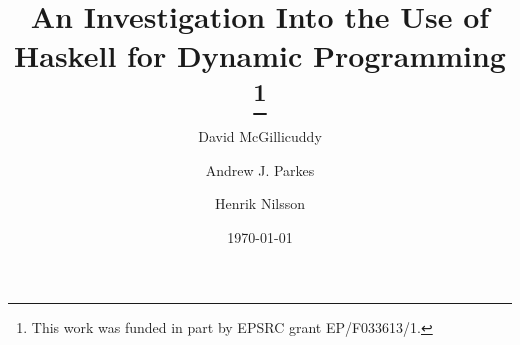 \documentclass[smallextended]{svjour3}       %
\begin{document}
\title{An Investigation Into the Use of Haskell for Dynamic Programming
\thanks{
This work was funded in part by EPSRC grant EP/F033613/1. 
}
}


\author{
	David McGillicuddy\and
	Andrew J. Parkes\and
	Henrik Nilsson
}



\date{\today}

\maketitle


\end{document}
